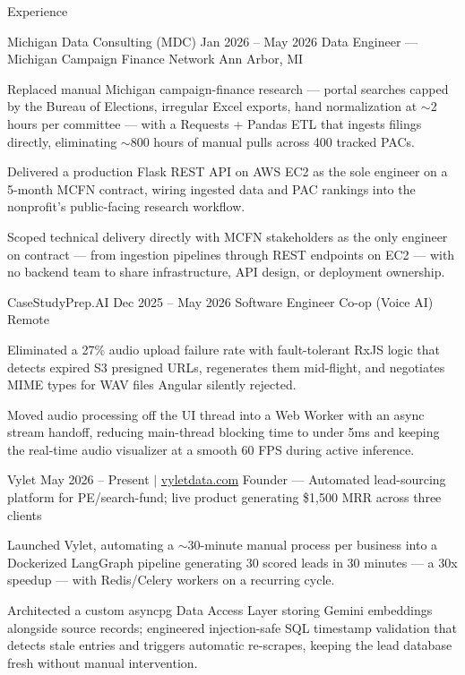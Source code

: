 \documentclass[
	11pt
]{../../../template}
\begin{document}
	\begin{rSection}{E}{xperience}
		\begin{rSectionEntry}
			{Michigan Data Consulting (MDC)}
			{Jan 2026 -- May 2026}
			{Data Engineer --- Michigan Campaign Finance Network}
			{}
			{Ann Arbor, MI}

			\item Replaced manual Michigan campaign-finance research --- portal searches capped by the Bureau of Elections, irregular Excel exports, hand normalization at $\sim$2 hours per committee --- with a Requests + Pandas ETL that ingests filings directly, eliminating $\sim$800 hours of manual pulls across 400 tracked PACs.
			\item Delivered a production Flask REST API on AWS EC2 as the sole engineer on a 5-month MCFN contract, wiring ingested data and PAC rankings into the nonprofit's public-facing research workflow.
			\item Scoped technical delivery directly with MCFN stakeholders as the only engineer on contract --- from ingestion pipelines through REST endpoints on EC2 --- with no backend team to share infrastructure, API design, or deployment ownership.
		\end{rSectionEntry}

		\begin{rSectionEntry}
			{CaseStudyPrep.AI}
			{Dec 2025 -- May 2026}
			{Software Engineer Co-op (Voice AI)}
			{}
			{Remote}

			\item Eliminated a 27\% audio upload failure rate with fault-tolerant RxJS logic that detects expired S3 presigned URLs, regenerates them mid-flight, and negotiates MIME types for WAV files Angular silently rejected.
			\item Moved audio processing off the UI thread into a Web Worker with an async stream handoff, reducing main-thread blocking time to under 5ms and keeping the real-time audio visualizer at a smooth 60 FPS during active inference.
		\end{rSectionEntry}

		\begin{rSectionEntry}
			{Vylet}
			{May 2026 -- Present $\vert$ \href{https://vyletdata.com}{vyletdata.com}}
			{Founder --- Automated lead-sourcing platform for PE/search-fund; live product generating \$1,500 MRR across three clients}
			{}
			{}

			\item Launched Vylet, automating a $\sim$30-minute manual process per business into a Dockerized LangGraph pipeline generating 30 scored leads in 30 minutes --- a 30x speedup --- with Redis/Celery workers on a recurring cycle.
			\item Architected a custom asyncpg Data Access Layer storing Gemini embeddings alongside source records; engineered injection-safe SQL timestamp validation that detects stale entries and triggers automatic re-scrapes, keeping the lead database fresh without manual intervention.
		\end{rSectionEntry}
	\end{rSection}
\end{document}
